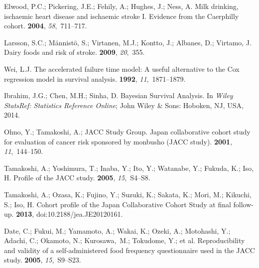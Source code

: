 \documentclass[nutrients,article,accept,moreauthors,pdftex]{Definitions/mdpi}
\begin{document}
\begin{thebibliography}{999}
Elwood, P.C.; Pickering, J.E.; Fehily, A.; Hughes, J.; Ness, A.
\newblock Milk drinking, ischaemic heart disease and ischaemic stroke I.
  Evidence from the Caerphilly cohort.
 {\bf 2004}, {\em
  58},~711--717.

Larsson, S.C.; M{\"a}nnist{\"o}, S.; Virtanen, M.J.; Kontto, J.; Albanes, D.;
  Virtamo, J.
\newblock Dairy foods and risk of stroke.
 {\bf 2009}, {\em 20},~355.

Wei, L.J.
\newblock The accelerated failure time model: A useful alternative to the Cox
  regression model in survival analysis.
 {\bf 1992}, {\em 11},~1871--1879.

Ibrahim, J.G.; Chen, M.H.; Sinha, D.
\newblock Bayesian Survival Analysis.
\newblock In {\em Wiley StatsRef: Statistics Reference Online}; John Wiley \& Sons:  Hoboken, NJ, USA, %
 2014.

Ohno, Y.; Tamakoshi, A.; JACC Study Group.
\newblock Japan collaborative cohort study for evaluation of cancer risk
  sponsored by monbusho (JACC study).
 {\bf 2001}, {\em 11},~144--150.

Tamakoshi, A.; Yoshimura, T.; Inaba, Y.; Ito, Y.; Watanabe, Y.; Fukuda, K.;
  Iso, H.
\newblock Profile of the JACC study.
 {\bf 2005}, {\em 15},~S4--S8.

Tamakoshi, A.; Ozasa, K.; Fujino, Y.; Suzuki, K.; Sakata, K.; Mori, M.;
  Kikuchi, S.; Iso, H.
\newblock Cohort profile of the Japan Collaborative Cohort Study at final
  follow-up.
 {\bf 2013}, doi:10.2188/jea.JE20120161.

Date, C.; Fukui, M.; Yamamoto, A.; Wakai, K.; Ozeki, A.; Motohashi, Y.; Adachi,
  C.; Okamoto, N.; Kurosawa,~M.; Tokudome, Y.; et al.
\newblock Reproducibility and validity of a self-administered food frequency
  questionnaire used in the JACC study.
 {\bf 2005}, {\em 15},~S9--S23.


\end{thebibliography}
\end{document}
